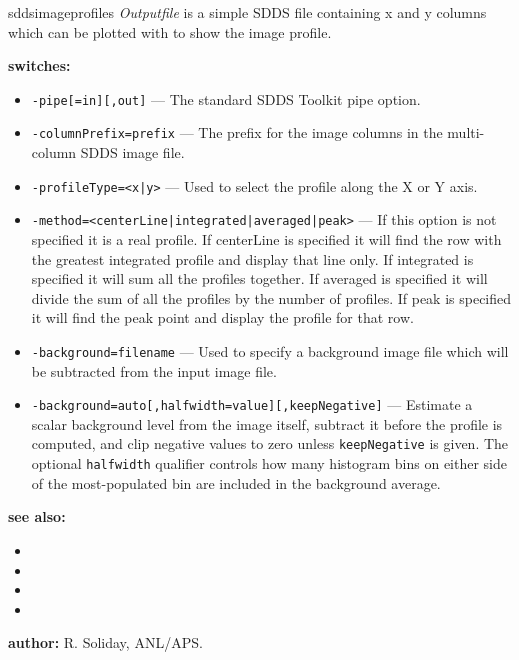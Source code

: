 \begin{sddsprog}{sddsimageprofiles}
    \emph{Outputfile} is a simple SDDS file containing x and y columns which can be plotted with  to show the image profile.
  \item \textbf{switches:}
    \begin{itemize}
      \item {\tt -pipe[=in][,out]} --- The standard SDDS Toolkit pipe option.
      \item {\tt -columnPrefix=prefix} --- The prefix for the image columns in the multi-column SDDS image file.
      \item {\tt -profileType=<x|y>} --- Used to select the profile along the X or Y axis.
      \item {\tt -method=<centerLine|integrated|averaged|peak>} --- If this option is not specified it is a real profile. If centerLine is specified it will find the row with the greatest integrated profile and display that line only. If integrated is specified it will sum all the profiles together. If averaged is specified it will divide the sum of all the profiles by the number of profiles. If peak is specified it will find the peak point and display the profile for that row.
      \item {\tt -background=filename} --- Used to specify a background image file which will be subtracted from the input image file.
      \item {\tt -background=auto[,halfwidth=value][,keepNegative]} --- Estimate a scalar background level from the image itself, subtract it before the profile is computed, and clip negative values to zero unless {\tt keepNegative} is given. The optional {\tt halfwidth} qualifier controls how many histogram bins on either side of the most-populated bin are included in the background average.
    \end{itemize}
  \item \textbf{see also:}
    \begin{itemize}
      \item {}
      \item {}
      \item {}
      \item {}
    \end{itemize}
  \item \textbf{author:} R. Soliday, ANL/APS.
\end{sddsprog}
